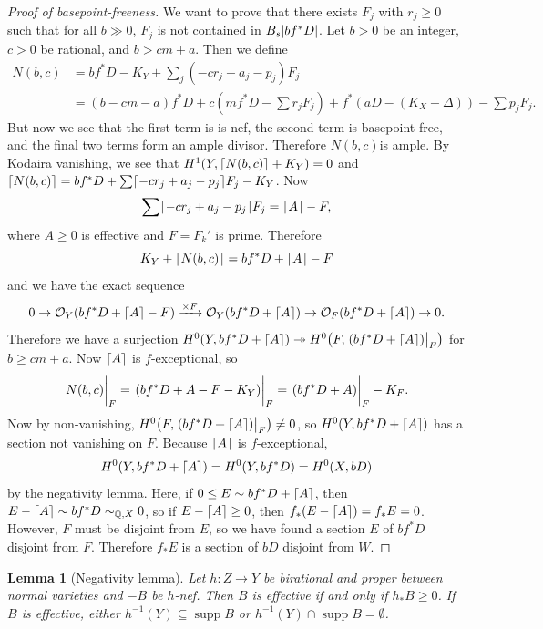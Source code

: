 \documentclass[leqno, openany]{memoir}
\DeclarePairedDelimiter{\ceil}{\lceil}{\rceil}
\newtheorem{lem}[thm]{Lemma}
\theoremstyle{definition}
\theoremstyle{remark}
\theoremstyle{plain}
\theoremstyle{definition}
\theoremstyle{remark}
\newcommand{\Q}{\mathbb{Q}}
\newcommand{\mc}[1]{\mathcal{#1}}
\begin{document}
\begin{proof}[Proof of basepoint-freeness]
    We want to prove that there exists $F_j$ with $r_j \geq 0$ such that for all $b \gg 0$, $F_j$ is not contained in $B_s \abs{bf^* D}$. Let $b > 0$ be an integer, $c > 0$ be rational, and $b > cm + a$. Then we define
    \begin{align*} 
        N(b, c) &= b f^* D - K_Y + \sum_j (-c r_j + a_j - p_j) F_j \\
                &= (b - cm - a) f^* D + c(mf^* D - \sum r_j F_j) + f^*(aD - (K_X+\Delta)) - \sum p_j F_j.
    \end{align*}
    But now we see that the first term is is nef, the second term is basepoint-free, and the final two terms form an ample divisor. Therefore $N(b,c)$is ample. By Kodaira vanishing, we see that $H^1(Y, \ceil{N(b, c)} + K_Y) = 0$ and $\ceil{N(b, c)} = bf^* D + \sum \ceil{- c r_j + a_j - p_j} F_j - K_Y$. Now
    \[ \sum \ceil{- c r_j + a_j - p_j} F_j = \ceil{A} - F, \]
    where $A \geq 0$ is effective and $F = F_k'$ is prime. Therefore
    \[ K_Y + \ceil{N(b,c)} = b f^* D + \ceil{A} - F \]
    and we have the exact sequence
    \[ 0 \to \mc{O}_Y(bf^*D + \ceil{A} - F) \xrightarrow{\times F} \mc{O}_Y(bf^* D + \ceil{A}) \to \mc{O}_F(bf^* D + \ceil{A}) \to 0. \]
    Therefore we have a surjection $H^0(Y, bf^* D + \ceil{A}) \twoheadrightarrow H^0\qty(F, \eval{( bf^* D + \ceil{A} )}_F)$ for $b \geq cm + a$. Now $\ceil{A}$ is $f$-exceptional, so
    \[ \eval{N(b, c)}_F = \eval{( bf^* D + A - F - K_Y )}_F = \eval{(bf^* D + A)}_F - K_F. \]
    Now by non-vanishing, $H^0\qty(F, \eval{ (bf^* D + \ceil{A}) }_F) \neq 0$, so $H^0(Y, bf^* D + \ceil{A})$ has a section not vanishing on $F$. Because $\ceil{A}$ is $f$-exceptional, 
    \[ H^0(Y, bf^* D + \ceil{A}) = H^0(Y, bf^* D) = H^0(X, bD) \]
    by the negativity lemma. Here, if $0 \leq E \sim bf^* D + \ceil{A}$, then $E - \ceil{A} \sim bf^* D \sim_{\Q, X} 0$, so if $E - \ceil{A} \geq 0$, then $f_* (E - \ceil{A}) = f_* E = 0$. However, $F$ must be disjoint from $E$, so we have found a section $E$ of $bf^* D$ disjoint from $F$. Therefore $f_* E$ is a section of $bD$ disjoint from $W$.
\end{proof}

\begin{lem}[Negativity lemma]
    Let $h \colon Z \to Y$ be birational and proper between normal varieties and $-B$ be $h$-nef. Then $B$ is effective if and only if $h_* B \geq 0$. If $B$ is effective, either $h^{-1}(Y) \subseteq \operatorname{supp} B$ or $h^{-1}(Y) \cap \operatorname{supp} B = \emptyset$.
\end{lem}
\end{document}
